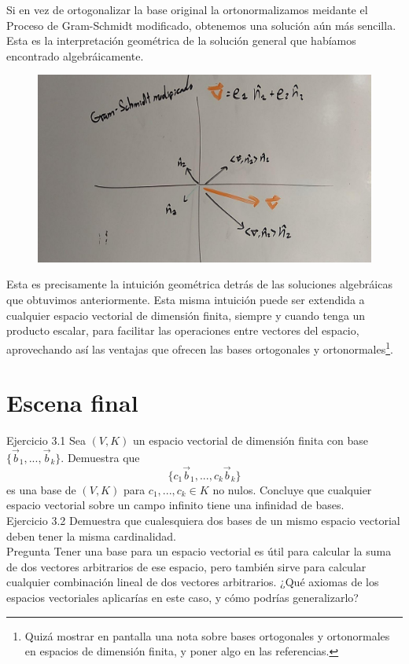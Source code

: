 \documentclass[12pt,dvipsnames]{article}
\numberwithin{equation}{section}
\begin{document}
Si en vez de ortogonalizar la base original la ortonormalizamos meidante el Proceso de Gram-Schmidt modificado, obtenemos una solución aún más sencilla. Esta es la interpretación geométrica de la solución general que habíamos encontrado algebráicamente.

\begin{figure}[h!]
    \centering
    \includegraphics[width=16cm]{3/Bases_ortogonales_y_ortonormales_3-5.jpg}
\end{figure}

Esta es precisamente la intuición geométrica detrás de las soluciones algebráicas que obtuvimos anteriormente. Esta misma intuición puede ser extendida a cualquier espacio vectorial de dimensión finita, siempre y cuando tenga un producto escalar, para facilitar las operaciones entre vectores del espacio, aprovechando así las ventajas que ofrecen las bases ortogonales y ortonormales\footnote{Quizá mostrar en pantalla una nota sobre bases ortogonales y ortonormales en espacios de dimensión finita, y poner algo en las referencias.}.

\newpage
\section{Escena final}

Ejercicio 3.1 Sea $(V,K)$ un espacio vectorial de dimensión finita con base $\{\vec{b}_1,...,\vec{b}_k\}$. Demuestra que $$\{c_1\vec{b}_1,...,c_k\vec{b}_k\}$$ es una base de $(V,K)$ para $c_1,...,c_k\in K$ no nulos. Concluye que cualquier espacio vectorial sobre un campo infinito tiene una infinidad de bases. \\

Ejercicio 3.2 Demuestra que cualesquiera dos bases de un mismo espacio vectorial deben tener la misma cardinalidad. \\

Pregunta Tener una base para un espacio vectorial es útil para calcular la suma de dos vectores arbitrarios de ese espacio, pero también sirve para calcular cualquier combinación lineal de dos vectores arbitrarios. ¿Qué axiomas de los espacios vectoriales aplicarías en este caso, y cómo podrías generalizarlo?
\end{document}
